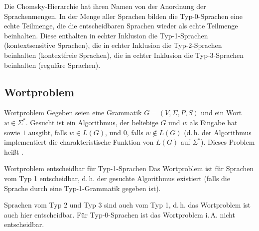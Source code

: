 \begin{Bem}
    Die Chomsky-Hierarchie hat ihren Namen von der Anordnung der
    Sprachenmengen.
    In der Menge aller Sprachen bilden die Typ-0-Sprachen eine echte Teilmenge,
    die die entscheidbaren Sprachen wieder als echte Teilmenge beinhalten.
    Diese enthalten in echter Inklusion die Typ-1-Sprachen
    (kontextsensitive Sprachen),
    die in echter Inklusion die Typ-2-Sprachen beinhalten
    (kontextfreie Sprachen),
    die in echter Inklusion die Typ-3-Sprachen beinhalten
    (reguläre Sprachen).
\end{Bem}

\pagebreak

\subsection{%
    Wortproblem%
}

\begin{Def}{Wortproblem}
    Gegeben seien eine Grammatik $G = (V, \Sigma, P, S)$ und ein Wort
    $w \in \Sigma^\ast$.
    Gesucht ist ein Algorithmus, der beliebige $G$ und $w$ als Eingabe hat
    sowie $1$ ausgibt, falls $w \in L(G)$, und
    $0$, falls $w \notin L(G)$
    (d.\,h. der Algorithmus implementiert die charakteristische Funktion
    von $L(G)$ auf $\Sigma^\ast$).
    Dieses Problem heißt .
\end{Def}

\begin{Satz}{Wortproblem entscheidbar für Typ-1-Sprachen}
    Das Wortproblem ist für Sprachen vom Typ 1 entscheidbar,
    d.\,h. der gesuchte Algorithmus existiert
    (falls die Sprache durch eine Typ-1-Grammatik gegeben ist).
\end{Satz}

\begin{Bem}
    Sprachen vom Typ 2 und Typ 3 sind auch vom Typ 1, d.\,h.
    das Wortproblem ist auch hier entscheidbar.
    Für Typ-0-Sprachen ist das Wortproblem i.\,A. nicht entscheidbar.
\end{Bem}

